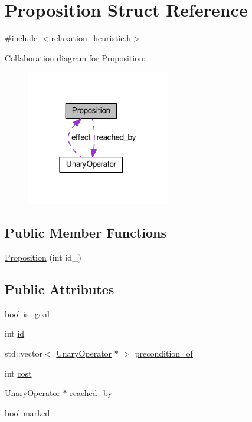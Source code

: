 \hypertarget{structProposition}{\section{Proposition Struct Reference}
\label{structProposition}
}


{\ttfamily \#include $<$relaxation\-\_\-heuristic.\-h$>$}



Collaboration diagram for Proposition\-:
\nopagebreak
\begin{figure}[H]
\begin{center}
\leavevmode
\includegraphics[width=178pt]{structProposition__coll__graph}
\end{center}
\end{figure}
\subsection*{Public Member Functions}
\begin{DoxyCompactItemize}
\item 
\hyperlink{structProposition_ad12aa3c8e9994b488cc67b33dfec09db}{Proposition} (int id\-\_\-)
\end{DoxyCompactItemize}
\subsection*{Public Attributes}
\begin{DoxyCompactItemize}
\item 
bool \hyperlink{structProposition_a35dfad2c1d63346e096f422a02974243}{is\-\_\-goal}
\item 
int \hyperlink{structProposition_a14f502f462f92578d6d6670c2a672e87}{id}
\item 
std\-::vector$<$ \hyperlink{structUnaryOperator}{Unary\-Operator} $\ast$ $>$ \hyperlink{structProposition_aaee1e7ac2c708cc09f06773766746873}{precondition\-\_\-of}
\item 
int \hyperlink{structProposition_a3645b63c6e394bb456181bacab80152d}{cost}
\item 
\hyperlink{structUnaryOperator}{Unary\-Operator} $\ast$ \hyperlink{structProposition_a8e4ab6a08578e2ba5b4d21632fde7378}{reached\-\_\-by}
\item 
bool \hyperlink{structProposition_a9f8cfee69ec00772a17bc9ce40b51707}{marked}
\end{DoxyCompactItemize}


